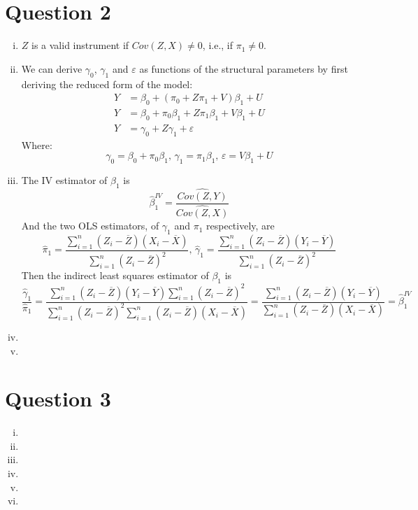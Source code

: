 \documentclass{article}
\newcommand{\sumn}{\sum_{i=1}^{n}}
\newcommand{\bhat}{\hat{\beta}}
\newcommand{\biv}{\bhat^{IV}}
\newcommand{\xbar}{\overline{X}}
\newcommand{\ybar}{\overline{Y}}
\newcommand{\zbar}{\overline{Z}}
\begin{document}
\pagebreak
\section*{Question 2}

\begin{enumerate}[(i)]
	\item $Z$ is a valid instrument if ${Cov(Z,X)\neq0}$, i.e., if ${\pi_1\neq 0}$.
	
	\item We can derive $\gamma_0$, $\gamma_1$ and $\varepsilon$ as functions of the structural parameters by first deriving the reduced form of the model:
		\begin{align*}
			Y &= \beta_0 + \left(\pi_0 + Z\pi_1 + V\right)\beta_1 + U 	\\
			Y &= \beta_0 + \pi_0\beta_1 + Z\pi_1\beta_1 + V\beta_1 + U 	\\
			Y &= \gamma_0 + Z\gamma_1 + \varepsilon
		\end{align*}
		Where:
		\[
			\gamma_0 = \beta_0 + \pi_0\beta_1\text{, }\gamma_1 = \pi_1\beta_1\text{, }\varepsilon = V\beta_1 + U
		\]
	
	\item The IV estimator of $\beta_1$ is $$ \biv_1 = \frac{\widehat{Cov(Z,Y)}}{\widehat{Cov(Z,X)}} $$ And the two OLS estimators, of $\gamma_1$ and $\pi_1$ respectively, are
		\[
			\hat{\pi}_1 = \frac{\sumn(Z_i-\zbar)(X_i-\xbar)}{\sumn(Z_i-\zbar)^2}\text{, }\hat{\gamma}_1 = \frac{\sumn(Z_i-\zbar)(Y_i-\ybar)}{\sumn(Z_i-\zbar)^2}
		\]
		Then the indirect least squares estimator of $\beta_1$ is 
		\[
			\frac{\hat{\gamma}_1}{\hat{\pi}_1} 	= \frac{\sumn(Z_i-\zbar)(Y_i-\ybar)\sumn(Z_i-\zbar)^2}{\sumn(Z_i-\zbar)^2\sumn(Z_i-\zbar)(X_i-\xbar)}
												= \frac{\sumn(Z_i-\zbar)(Y_i-\ybar)}{\sumn(Z_i-\zbar)(X_i-\xbar)} = \biv_1
		\]
	
	\item 
	
	\item 
	
\end{enumerate}


\section*{Question 3}

\begin{enumerate}[(i)]
	\item 
	
	\item 
	
	\item 
	
	\item 
	
	\item 
	
	\item 
\end{enumerate}

\end{document}
